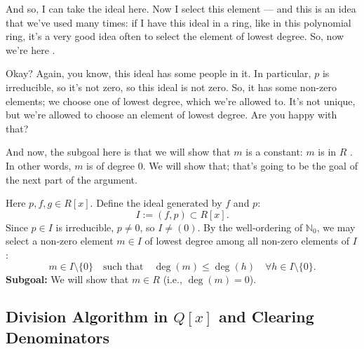 \begin{proofWrapper}
\begin{speech}[00:16:43 - 00:18:50]
And so, I can take the ideal here. Now I select this element --- and this is an idea that we've used many times: if I have this ideal in a ring, like in this polynomial ring, it's a very good idea often to select the element of lowest degree. So, now we're here .

Okay? Again, you know, this ideal has some people in it. In particular, $p$ is irreducible, so it's not zero, so this ideal is not zero. So, it has some non-zero elements; we choose one of lowest degree, which we're allowed to. It's not unique, but we're allowed to choose an element of lowest degree. Are you happy with that?

And now, the subgoal here is that we will show that $m$ is a constant: $m$ is in $R$ . In other words, $m$ is of degree $0$. We will show that; that's going to be the goal of the next part of the argument.
\end{speech}

\begin{content}[{Constructing $I = (f, p)$ and Selecting $m$ of Lowest Degree}]
Here $p, f, g \in R[x]$. Define the ideal generated by $f$ and $p$:
\begin{equation}\label{eq:ideal-fp}
I := (f, p) \subset R[x].
\end{equation}
Since $p \in I$ is irreducible, $p \neq 0$, so $I \neq (0)$. By the well-ordering of $\mathbb{N}_0$, we may select a non-zero element $m \in I$ of lowest degree among all non-zero elements of $I$:
\begin{equation}\label{eq:minimal-m}
m \in I \setminus \{0\} \quad \text{such that} \quad \deg(m) \le \deg(h) \quad \forall h \in I \setminus \{0\}.
\end{equation}
\textbf{Subgoal:} We will show that $m \in R$ (i.e., $\deg(m) = 0$).
\end{content}

\begin{hidden}
\end{hidden}

\subsection{Division Algorithm in \texorpdfstring{$Q[x]$}{Q[x]} and Clearing Denominators}


\end{proofWrapper}
